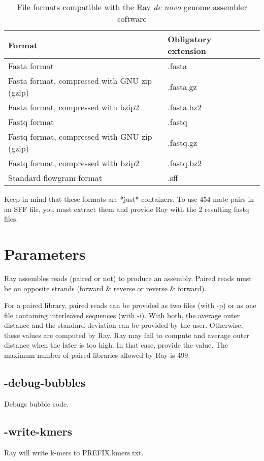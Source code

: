\documentclass{article}
\begin{document}
\begin{table}[h]
\caption{File formats compatible with the Ray \emph{de novo} genome assembler software}\label{formats}
\begin{tabular}{lll}
\hline
Format & Obligatory extension \\
\hline
Fasta format & .fasta\\
Fasta format, compressed with GNU zip (gzip) & .fasta.gz \\
Fasta format, compressed with bzip2 & .fasta.bz2 \\
Fastq format & .fastq\\
Fastq format, compressed with GNU zip (gzip) & .fastq.gz \\
Fastq format, compressed with bzip2 & .fastq.bz2 \\
Standard flowgram format & .sff \\
\hline
\end{tabular}
\end{table}

Keep in mind that these formats are *just* containers.
To use 454 mate-pairs in an SFF file, you must extract them
and provide Ray with the 2 resulting fastq files.


\section{Parameters}

Ray assembles reads (paired or not) to produce an assembly.
Paired reads must be on opposite strands (forward \& reverse or reverse \& forward).

For a paired library, paired reads can be provided as two files (with -p) or as one file containing interleaved
sequences (with -i).
With both, the average outer distance and the standard deviation can be provided by the user. Otherwise, these values are
computed by Ray. Ray may fail to compute and average outer distance when the later is too high.
In that case, provide the value.
The maximum  number of paired libraries allowed by Ray is 499.

\subsection{      
 -debug-bubbles
}
              Debugs bubble code.

\subsection{
-write-kmers
}
Ray will write k-mers to PREFIX.kmers.txt.
\end{document}
